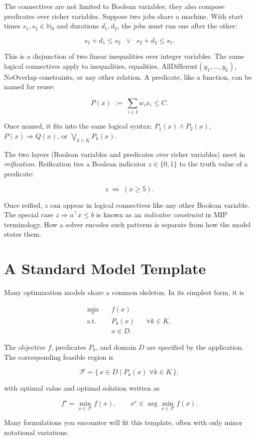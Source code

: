 The connectives are not limited to Boolean variables; they also compose
predicates over richer variables. Suppose two jobs share a machine. With
start times \(s_1, s_2 \in \mathbb{N}_0\) and durations \(d_1, d_2\),
the jobs must run one after the other:

\[
s_1 + d_1 \le s_2 \;\;\lor\;\; s_2 + d_2 \le s_1.
\]

This is a disjunction of two linear inequalities over integer variables.
The same logical connectives apply to inequalities, equalities,
\(\text{AllDifferent}(y_1,\ldots,y_k)\), \(\text{NoOverlap}\)
constraints, or any other relation. A predicate, like a function, can be
named for reuse:

\[
P(x) \;:=\; \sum_{i \in I} w_i x_i \le C.
\]

Once named, it fits into the same logical syntax:
\(P_1(x) \land P_2(x)\), \(P(x) \Rightarrow Q(x)\), or
\(\bigvee_{k \in K} P_k(x)\).

The two layers (Boolean variables and predicates over richer
variables) meet in \emph{reification}. Reification ties a Boolean
indicator \(z \in \{0,1\}\) to the truth value of a predicate:

\[
z \;\Leftrightarrow\; (x \ge 5).
\]

Once reified, \(z\) can appear in logical connectives like any other
Boolean variable. The special case \(z \Rightarrow a^\top x \le b\) is
known as an \emph{indicator constraint} in MIP terminology. How a solver
encodes such patterns is separate from how the model states them.

\section{A Standard Model Template}\label{sec:2.9}

Many optimization models share a common skeleton. In its simplest form,
it is

\[
\begin{aligned}
\min_{x} \quad      & f(x) \\
\text{s.t.} \quad   & P_k(x) && \forall k \in K, \\
                    & x \in D.
\end{aligned}
\]

The objective \(f\), predicates \(P_k\), and domain \(D\) are specified
by the application. The corresponding feasible region is

\[
\mathcal{F} = \{\, x \in D \mid P_k(x) \;\forall k \in K \,\},
\]

with optimal value and optimal solution written as

\[
f^\star = \min_{x \in \mathcal{F}} f(x),\qquad
x^\star \in \arg\min_{x \in \mathcal{F}} f(x).
\]

Many formulations you encounter will fit this template, often with only
minor notational variations.
